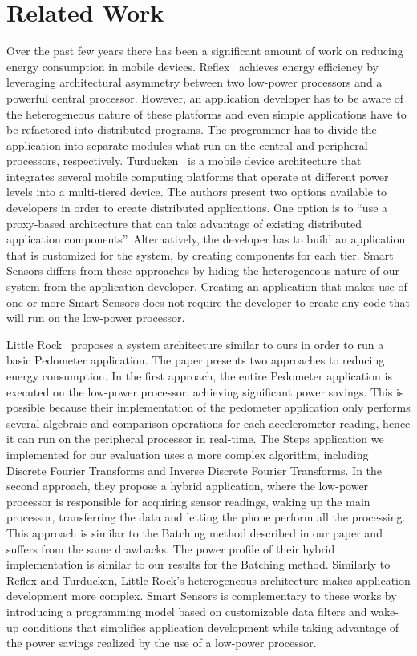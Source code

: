 \section{Related Work}\label{sec:related}

Over the past few years there has been a significant amount of work on reducing energy consumption in mobile devices. Reflex~\cite{reflex} achieves energy efficiency by leveraging architectural asymmetry between two low-power processors and a powerful central processor. However, an application developer has to be aware of the heterogeneous nature of these platforms and even simple applications have to be refactored into distributed programs. The programmer has to divide the application into separate modules what run on the central and peripheral processors, respectively. Turducken~\cite{turducken} is a mobile device architecture that integrates several mobile computing platforms that operate at different power levels into a multi-tiered device. The authors present two options available to developers in order to create distributed applications. One option is to ``use a proxy-based architecture that can take advantage of existing distributed application components''. Alternatively, the developer has to build an application that is customized for the system, by creating components for each tier. Smart Sensors differs from these approaches by hiding the heterogeneous nature of our system from the application developer. Creating an application that makes use of one or more Smart Sensors does not require the developer to create any code that will run on the low-power processor.

Little Rock~\cite{littlerock} proposes a system architecture similar to ours in order to run a basic Pedometer application. The paper presents two approaches to reducing energy consumption. In the first approach, the entire Pedometer application is executed on the low-power processor, achieving significant power savings. This is possible because their implementation of the pedometer application only performs several algebraic and comparison operations for each accelerometer reading, hence it can run on the peripheral processor in real-time. The Steps application we implemented for our evaluation uses a more complex algorithm, including Discrete Fourier Transforms and Inverse Discrete Fourier Transforms. In the second approach, they propose a hybrid application, where the low-power processor is responsible for acquiring sensor readings, waking up the main processor, transferring the data and letting the phone perform all the processing. This approach is similar to the Batching method described in our paper and suffers from the same drawbacks. The power profile of their hybrid implementation is similar to our results for the Batching method. Similarly to Reflex and Turducken, Little Rock's heterogeneous architecture makes application development more complex. Smart Sensors is complementary to these works by introducing a programming model based on customizable data filters and wake-up conditions that simplifies application development while taking advantage of the power savings realized by the use of a low-power processor.

